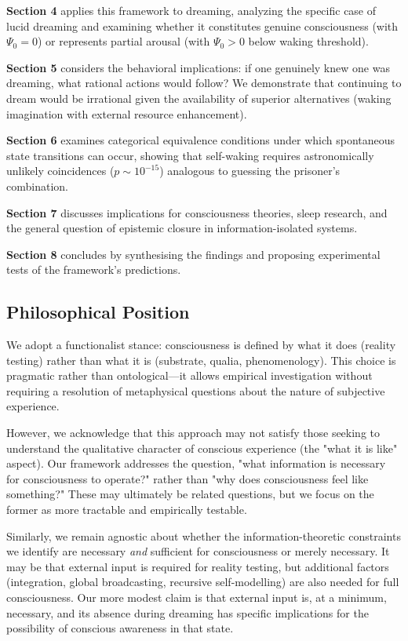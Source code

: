 \documentclass[11pt,a4paper]{article}
\begin{document}
\textbf{Section 4} applies this framework to dreaming, analyzing the specific case of lucid dreaming and examining whether it constitutes genuine consciousness (with $\Psi_0 = 0$) or represents partial arousal (with $\Psi_0 > 0$ below waking threshold).

\textbf{Section 5} considers the behavioral implications: if one genuinely knew one was dreaming, what rational actions would follow? We demonstrate that continuing to dream would be irrational given the availability of superior alternatives (waking imagination with external resource enhancement).

\textbf{Section 6} examines categorical equivalence conditions under which spontaneous state transitions can occur, showing that self-waking requires astronomically unlikely coincidences ($p \sim 10^{-15}$) analogous to guessing the prisoner's combination.

\textbf{Section 7} discusses implications for consciousness theories, sleep research, and the general question of epistemic closure in information-isolated systems.

\textbf{Section 8} concludes by synthesising the findings and proposing experimental tests of the framework's predictions.

\subsection{Philosophical Position}

We adopt a functionalist stance: consciousness is defined by what it does (reality testing) rather than what it is (substrate, qualia, phenomenology). This choice is pragmatic rather than ontological—it allows empirical investigation without requiring a resolution of metaphysical questions about the nature of subjective experience.

However, we acknowledge that this approach may not satisfy those seeking to understand the qualitative character of conscious experience (the "what it is like" aspect). Our framework addresses the question, "what information is necessary for consciousness to operate?" rather than "why does consciousness feel like something?" These may ultimately be related questions, but we focus on the former as more tractable and empirically testable.

Similarly, we remain agnostic about whether the information-theoretic constraints we identify are necessary \textit{and} sufficient for consciousness or merely necessary. It may be that external input is required for reality testing, but additional factors (integration, global broadcasting, recursive self-modelling) are also needed for full consciousness. Our more modest claim is that external input is, at a minimum, necessary, and its absence during dreaming has specific implications for the possibility of conscious awareness in that state.
\end{document}
